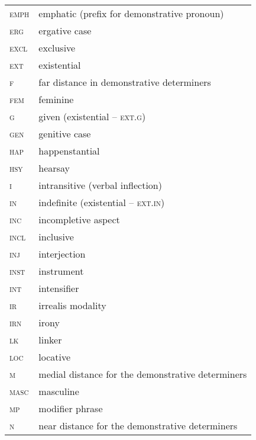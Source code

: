 \begin{tabularx} {.45\textwidth}{>{\scshape}lQ}
emph       & emphatic (prefix for demonstrative pronoun) \\
erg       & ergative case \\
excl       & exclusive \\
ext       & existential \\
f       & far distance in demonstrative determiners \\
fem       & feminine  \\
g       & given (existential -- \textsc{ext.g}) \\
gen       & genitive case \\
hap       & happenstantial \\
hsy       & hearsay \\
i       & intransitive (verbal inflection)\\
in       & indefinite (existential -- \textsc{ext.in})\\
inc       & incompletive aspect \\
incl        & inclusive \\
inj       & interjection \\
inst        & instrument \\
int       & intensifier \\
ir       & irrealis modality \\
irn       & irony \\
lk       & linker \\
loc       & locative \\
m       & medial distance for the demonstrative determiners \\
masc       & masculine \\
mp       & modifier phrase \\
n       & near distance for the demonstrative determiners \\
\end{tabularx}

